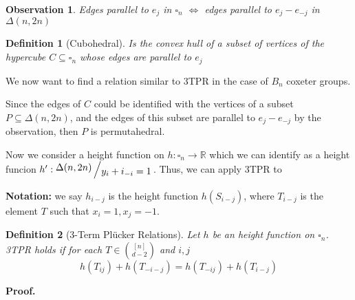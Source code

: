 \documentclass{myclass}
\newtheorem*{definition}{Definition}
\newtheorem*{observation}{Observation}
\newcommand{\bigslant}[2]{{\raisebox{.2em}{$#1$}\left/\raisebox{-.2em}{$#2$}\right.}}
\begin{document}
\begin{observation}
  Edges parallel to $e_j$ in  $\square_n$ $\iff$ edges parallel to $e_j-e_{-j}$ in $\Delta(n, 2n)$
\end{observation}

\begin{definition}[Cubohedral]
Is the convex hull of a subset of vertices of the hypercube $C\subseteq \square_n$ whose edges are parallel to $e_j$
\end{definition}

We now want to find a relation similar to 3TPR in the case of  $B_n$ coxeter groups.

Since the edges of $C$ could be identified with the vertices of a subset $P\subseteq \Delta(n, 2n)$, and the edges of this subset are parallel to $e_j-e_{-j}$ by the observation, then $P$ is permutahedral.

Now we consider a height function on $h:\square_n \to \mathbb{R}$ which we can identify as a height funcion $h': \bigslant{\Delta(n, 2n)}{y_i+i_{-i} = 1}$. Thus, we can apply 3TPR to 

\textbf{Notation:} we say $h_{i-j}$ is the height function $h(S_{i-j})$, where $T_{i-j}$ is the element $T$ such that $x_i = 1, x_j = -1$.

\begin{definition}[3-Term Plücker Relations] Let $h$ be an height function on $\square_n$.
3TPR holds if for each $T\in \binom{[n]}{d-2}$ and $i, j$
\[
h(T_{ij})+ h(T_{-i-j}) = h(T_{-ij}) + h(T_{i-j})
\] 
\end{definition}

\textbf{Proof.}
\end{document}
